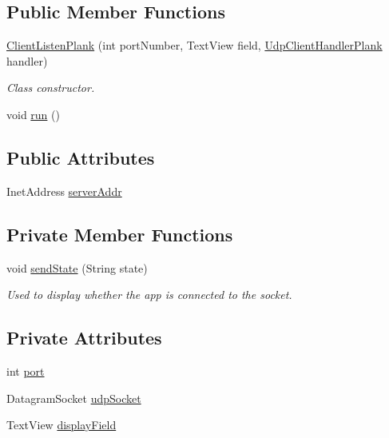 \subsection*{Public Member Functions}
\begin{DoxyCompactItemize}
\item 
\mbox{\hyperlink{classcom_1_1example_1_1trainawearapplication_1_1_client_listen_plank_af1cb478f41c794eaa377a1150009d070}{Client\+Listen\+Plank}} (int port\+Number, Text\+View field, \mbox{\hyperlink{classcom_1_1example_1_1trainawearapplication_1_1_udp_client_handler_plank}{Udp\+Client\+Handler\+Plank}} handler)
\begin{DoxyCompactList}\small\item\em Class constructor. \end{DoxyCompactList}\item 
void \mbox{\hyperlink{classcom_1_1example_1_1trainawearapplication_1_1_client_listen_plank_adb139f918c79291e8492364927a0b945}{run}} ()
\end{DoxyCompactItemize}
\subsection*{Public Attributes}
\begin{DoxyCompactItemize}
\item 
Inet\+Address \mbox{\hyperlink{classcom_1_1example_1_1trainawearapplication_1_1_client_listen_plank_ae4ec71dafa5b734e69c3576bda12e0b8}{server\+Addr}}
\end{DoxyCompactItemize}
\subsection*{Private Member Functions}
\begin{DoxyCompactItemize}
\item 
void \mbox{\hyperlink{classcom_1_1example_1_1trainawearapplication_1_1_client_listen_plank_ab7af22341c89f6a1263612df9516d6e6}{send\+State}} (String state)
\begin{DoxyCompactList}\small\item\em Used to display whether the app is connected to the socket. \end{DoxyCompactList}\end{DoxyCompactItemize}
\subsection*{Private Attributes}
\begin{DoxyCompactItemize}
\item 
int \mbox{\hyperlink{classcom_1_1example_1_1trainawearapplication_1_1_client_listen_plank_aa394560dfa0da718f5ca639b82795395}{port}}
\item 
Datagram\+Socket \mbox{\hyperlink{classcom_1_1example_1_1trainawearapplication_1_1_client_listen_plank_a1834dc9b799cdf87ebf89fd34136ccfa}{udp\+Socket}}
\item 
Text\+View \mbox{\hyperlink{classcom_1_1example_1_1trainawearapplication_1_1_client_listen_plank_a2b606ab855a6ec1cabbb5f84a0eb1de0}{display\+Field}}
\end{DoxyCompactItemize}


